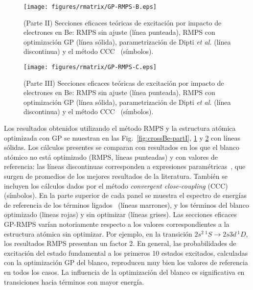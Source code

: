 \begin{figure}
\centering
\texttt{[image: figures/rmatrix/GP-RMPS-B.eps]} 
\caption[Secciones eficaces de excitación de Be (Parte II).]
{(Parte II) Secciones eficaces teóricas de excitación por impacto de 
electrones en Be: RMPS sin ajuste (línea punteada), RMPS con optimización 
GP (línea sólida), parametrización de Dipti \textit{et al.}
\cite{Dipti:19} (línea discontinua) y el método CCC~\cite{Fursa:97}
(símbolos).}
\label{fig:crossBe-partII}
\end{figure}

\begin{figure}[t]
\centering
\texttt{[image: figures/rmatrix/GP-RMPS-C.eps]} 
\caption[Secciones eficaces de excitación de Be (Parte II).]
{(Parte III) Secciones eficaces teóricas de excitación por impacto de 
electrones en Be: RMPS sin ajuste (línea punteada), RMPS con optimización 
GP (línea sólida), parametrización de Dipti \textit{et al.}
\cite{Dipti:19} (línea discontinua) y el método CCC~\cite{Fursa:97}
(símbolos).}
\label{fig:crossBe-partIII}
\end{figure}

Los resultados obtenidos utilizando el método RMPS y la estructura 
atómica optimizada con GP se muestran en las 
Fig.~\ref{fig:crossBe-partI}, \ref{fig:crossBe-partII} y 
\ref{fig:crossBe-partIII} con líneas sólidas. Los cálculos presentes se 
comparan con resultados en los que el blanco atómico no está optimizado 
(RMPS, líneas punteadas) y con valores de referencia: las líneas 
discontinuas corresponden a expresiones paramétricas~\cite{Dipti:19}, 
que surgen de promedios de los mejores resultados de la literatura. 
También se incluyen los cálculos dados por el método \textit{convergent 
close-coupling} (CCC)~\cite{Fursa:97} (símbolos). En la parte superior 
de cada panel se muestra el espectro de energías de referencia de los 
términos ligados~\cite{NIST} (líneas marrones), y los términos del 
blanco optimizado (lineas rojas) y sin optimizar (líneas grises). Las 
secciones eficaces GP-RMPS varían notoriamente respecto a los valores 
correspondientes a la estructura atómica sin optimizar. Por ejemplo, en 
la transición $2s^2\,^1\!S\rightarrow 2s3d\,^1\!D$, los resultados RMPS
presentan un factor 2. En general, las probabilidades de excitación del 
estado fundamental a los primeros 10 estados excitados, calculadas con 
la optimización GP del blanco, reproducen muy bien los valores de 
referencia en todos los casos. La influencia de la optimización del 
blanco es significativa en transiciones hacia términos con mayor 
energía. 

